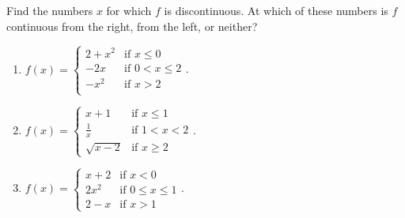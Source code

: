 Find the numbers $x$ for which $f$ is discontinuous. At which of these numbers is $f$ continuous from the right, from the left, or neither? 
\begin{multicols}{2}
\begin{enumerate}
\item $f(x)=
\left\{\begin{array}{ll}
2+x^2 & \text{if~} x\leq 0 \\
-2x& \text{if~} 0<x\leq 2\\
-x^2& \text{if~} x>2\\
\end{array}\right.
$.
\item $f(x)=
\left\{\begin{array}{ll}
x+1 & \text{if~} x\leq 1\\
\frac{1}{x}& \text{if~}1<x<2 \\
\sqrt{x-2}& \text{if~} x\geq 2
\end{array}\right.$.
\item $f(x)=
\left\{\begin{array}{ll}
x+2& \text{if~} x<0\\
2x^2& \text{if~} 0\leq x\leq 1\\ 
2-x& \text{if~}x>1 \end{array}\right.$.
\end{enumerate}
\end{multicols}
